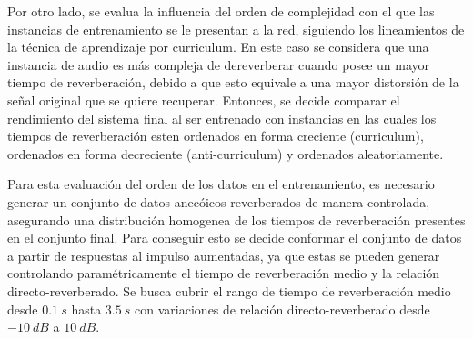 Por otro lado, se evalua la influencia del orden de complejidad con el que las instancias de entrenamiento se le presentan a la red, siguiendo los lineamientos de la técnica de aprendizaje por curriculum. En este caso se considera que una instancia de audio es más compleja de dereverberar cuando posee un mayor tiempo de reverberación, debido a que esto equivale a una mayor distorsión de la señal original que se quiere recuperar. Entonces, se decide comparar el rendimiento del sistema final al ser entrenado con instancias en las cuales los tiempos de reverberación esten ordenados en forma creciente (curriculum), ordenados en forma decreciente (anti-curriculum) y ordenados aleatoriamente. 

Para esta evaluación del orden de los datos en el entrenamiento, es necesario generar un conjunto de datos anecóicos-reverberados de manera controlada, asegurando una distribución homogenea de los tiempos de reverberación presentes en el conjunto final. Para conseguir esto se decide conformar el conjunto de datos a partir de respuestas al impulso aumentadas, ya que estas se pueden generar controlando paramétricamente el tiempo de reverberación medio y la relación directo-reverberado. Se busca cubrir el rango de tiempo de reverberación medio desde $0.1 \ s$ hasta $3.5 \ s$ con variaciones de relación directo-reverberado desde $-10 \ dB$ a $10 \ dB$. 










